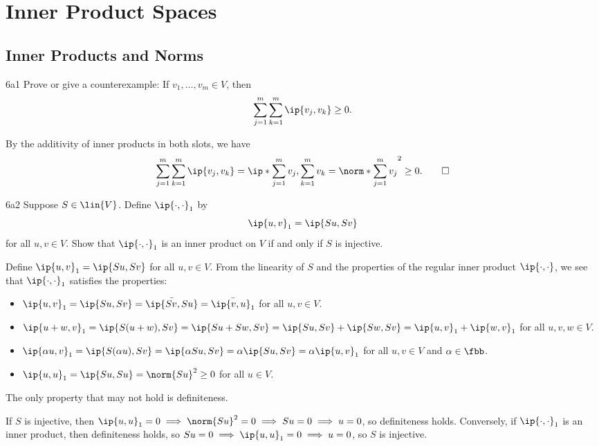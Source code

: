 \section{Inner Product Spaces}

\subsection{Inner Products and Norms}

\begin{exercise}{6a1}
    Prove or give a counterexample: If $v_1, \ldots, v_m \in V$, then
    \[
        \sum_{j=1}^{m} \sum_{k=1}^{m} \ip{v_j, v_k} \geq 0.
    \]
\end{exercise}

\begin{sol}
    By the additivity of inner products in both slots, we have
    \[
        \sum_{j=1}^{m} \sum_{k=1}^{m} \ip{v_j, v_k} = \ip*{\sum_{j=1}^{m} v_j, \sum_{k=1}^{m} v_k} = \norm*{\sum_{j=1}^{m} v_j}^2 \geq 0. \qedhere
    \]
\end{sol}

\begin{exercise}{6a2}
    Suppose $S \in \lin{V}$.
    Define $\ip{\cdot, \cdot}_1$ by
    \[
        \ip{u, v}_1 = \ip{Su, Sv}
    \]
    for all $u, v \in V$.
    Show that $\ip{\cdot, \cdot}_1$ is an inner product on $V$ if and only if $S$ is injective.
\end{exercise}

\begin{sol}
    Define $\ip{u, v}_1 = \ip{Su, Sv}$ for all $u, v \in V$.
    From the linearity of $S$ and the properties of the regular inner product $\ip{\cdot, \cdot}$, we see that $\ip{\cdot, \cdot}_1$ satisfies the properties:
    \begin{itemize}
        \item $\ip{u, v}_1 = \ip{Su, Sv} = \bar{\ip{Sv, Su}} = \bar{\ip{v, u}_1}$ for all $u, v \in V$.
        \item $\ip{u + w, v}_1 = \ip{S(u + w), Sv} = \ip{Su + Sw, Sv} = \ip{Su, Sv} + \ip{Sw, Sv} = \ip{u, v}_1 + \ip{w, v}_1$ for all $u, v, w \in V$.
        \item $\ip{\alpha u, v}_1 = \ip{S(\alpha u), Sv} = \ip{\alpha Su, Sv} = \alpha \ip{Su, Sv} = \alpha \ip{u, v}_1$ for all $u, v \in V$ and $\alpha \in \fbb$.
        \item $\ip{u, u}_1 = \ip{Su, Su} = \norm{Su}^2 \geq 0$ for all $u \in V$.
    \end{itemize}
    The only property that may not hold is definiteness.

    If $S$ is injective, then $\ip{u, u}_1 = 0 \implies \norm{Su}^2 = 0 \implies Su = 0 \implies u = 0$, so definiteness holds.
    Conversely, if $\ip{\cdot, \cdot}_1$ is an inner product, then definiteness holds, so $Su = 0 \implies \ip{u, u}_1 = 0 \implies u = 0$, so $S$ is injective.
\end{sol}

